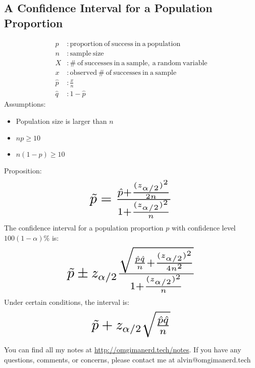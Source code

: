 \documentclass{math}
\begin{document}
\subsection*{A Confidence Interval for a Population Proportion}
\begin{align*}
  p&: \mathrm{proportion\ of\ success\ in\ a\ population} \\
  n&: \mathrm{sample\ size} \\
  X&: \mathrm{\#\ of\ successes\ in\ a\ sample,\ a\ random\ variable} \\
  x&: \mathrm{observed\ \#\ of\ successes\ in\ a\ sample} \\
  \hat{p}&: \frac{x}{n} \\
  \hat{q}&: 1-\hat{p}
\end{align*}
Assumptions:
\begin{itemize}
  \item Population size is larger than \( n \)
  \item \( np\geq 10 \)
  \item \( n(1-p)\geq 10 \)
\end{itemize}
Proposition:
\[ \scalebox{2}{$
  \tilde{p} = \frac{\hat{p}+\frac{(z_{\alpha/2})^{2}}{2n}}
  {1+\frac{(z_{\alpha/2})^{2}}{n}}
$} \]
The confidence interval for a population proportion \( p \) with confidence
level \( 100(1-\alpha)\% \) is:
\[ \scalebox{2}{$
  \tilde{p}\pm z_{\alpha/2}\frac{\sqrt{
  \frac{\hat{p}\hat{q}}{n}+\frac{(z_{\alpha/2})^{2}}{4n^{2}}
  }}{1+\frac{(z_{\alpha/2})^{2}}{n}}
$} \]
Under certain conditions, the interval is:
\[ \scalebox{2}{$
  \tilde{p}+z_{\alpha/2}\sqrt{\frac{\hat{p}\hat{q}}{n}}
$} \]

\begin{center}
  You can find all my notes at \url{http://omgimanerd.tech/notes}. If you have
  any questions, comments, or concerns, please contact me at
  alvin@omgimanerd.tech
\end{center}
\end{document}
